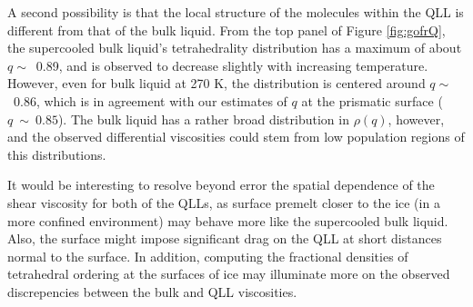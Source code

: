 A second possibility is that the local structure of the molecules
within the QLL is different from that of the bulk liquid. From the top
panel of Figure \ref{fig:gofrQ}, the supercooled bulk liquid's
tetrahedrality distribution has a maximum of about $q \sim$~0.89, and
is observed to decrease slightly with increasing temperature. However,
even for bulk liquid at 270 K, the distribution is centered around
$q \sim$~0.86, which is in agreement with our estimates of $q$ at the
prismatic surface ($q~\sim~0.85$). The bulk liquid has a rather broad
distribution in $\rho (q)$, however, and the observed differential
viscosities could stem from low population regions of this
distributions. 

It would be interesting to resolve beyond error the spatial dependence
of the shear viscosity for both of the QLLs, as surface premelt closer
to the ice (in a more confined environment) may behave more like
the supercooled bulk liquid. Also, the surface might impose significant
drag on the QLL at short distances normal to the surface. In addition,
computing the fractional densities of tetrahedral ordering at the
surfaces of ice may illuminate more on the observed discrepencies
between the bulk and QLL viscosities. 







